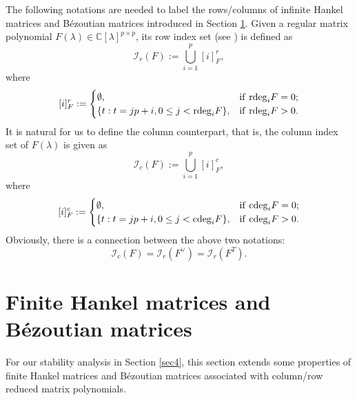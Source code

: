\documentclass[12pt,reqno]{amsart}
\theoremstyle{plain}
\numberwithin{equation}{section}
\theoremstyle{remark}
\begin{document}
 The following notations are needed to label the rows/columns of infinite Hankel matrices and B\'ezoutian matrices introduced in Section \ref{Sec3}.
Given a regular matrix polynomial $F(\lambda)\in \mathbb C[\lambda]^{p\times p}$, its row index set (see \cite{BPV}) is defined as
$$
\mathcal I_r(F):=\bigcup_{i=1}^p[i]^r_{F},
$$
where 
$$
[i]^r_{F}:=\begin{cases}
\emptyset, & {\rm if }\ {\rm rdeg}_iF=0;\\
\{t:t=jp+i,0\leq j< {\rm rdeg}_iF\}, & {\rm if }\ {\rm rdeg}_iF>0.
\end{cases}
$$  
It is natural for us to define the column counterpart, that is, the column index set  of $F(\lambda)$ is given as
$$
\mathcal I_c(F):=\bigcup_{i=1}^p[i]^c_{F},
$$
where 
$$
[i]^c_{F}:=\begin{cases}
\emptyset, & {\rm if }\ {\rm cdeg}_iF=0;\\
\{t:t=jp+i,0\leq j< {\rm cdeg}_iF\}, & {\rm if }\ {\rm cdeg}_iF>0.
\end{cases}
$$
Obviously, there is a connection between the above two notations:
\begin{equation}\label{Icr}
\mathcal I_c(F)=\mathcal I_{r}(F^{\vee})=\mathcal I_{r}(F^{T}).
\end{equation}



\section{Finite Hankel matrices and B\'ezoutian matrices}\label{Sec3}

For our stability analysis in Section \ref{sec4}, this section extends some properties of finite Hankel matrices and B\'ezoutian matrices associated with column/row reduced matrix polynomials.
\end{document}
